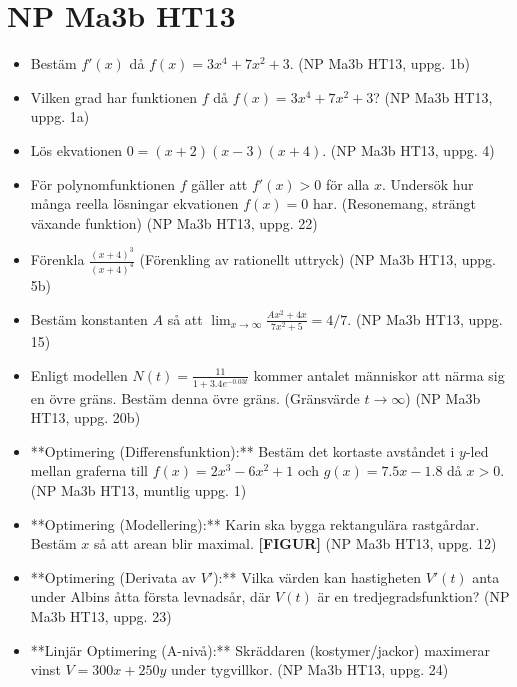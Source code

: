 \documentclass{article}
\begin{document}
\section*{NP Ma3b HT13}
\begin{itemize}
    \item Bestäm $f'(x)$ då $f(x) = 3x^4 + 7x^2 + 3$. (NP Ma3b HT13, uppg. 1b)
    \item Vilken grad har funktionen $f$ då $f(x) = 3x^4 + 7x^2 + 3$? (NP Ma3b HT13, uppg. 1a)
    \item Lös ekvationen $0 = (x+2)(x-3)(x+4)$. (NP Ma3b HT13, uppg. 4)
    \item För polynomfunktionen $f$ gäller att $f'(x) > 0$ för alla $x$. Undersök hur många reella lösningar ekvationen $f(x) = 0$ har. (Resonemang, strängt växande funktion) (NP Ma3b HT13, uppg. 22)
    \item Förenkla $\frac{(x+4)^3}{(x+4)^4}$ (Förenkling av rationellt uttryck) (NP Ma3b HT13, uppg. 5b)
    \item Bestäm konstanten $A$ så att $\lim_{x \to \infty} \frac{A x^2 + 4 x}{7 x^2 + 5} = 4/7$. (NP Ma3b HT13, uppg. 15)
    \item Enligt modellen $N(t) = \frac{11}{1+3.4e^{-0.03t}}$ kommer antalet människor att närma sig en övre gräns. Bestäm denna övre gräns. (Gränsvärde $t \to \infty$) (NP Ma3b HT13, uppg. 20b)
    \item **Optimering (Differensfunktion):** Bestäm det kortaste avståndet i $y$-led mellan graferna till $f(x) = 2x^3 - 6x^2 + 1$ och $g(x) = 7.5x - 1.8$ då $x>0$. (NP Ma3b HT13, muntlig uppg. 1)
    \item **Optimering (Modellering):** Karin ska bygga rektangulära rastgårdar. Bestäm $x$ så att arean blir maximal. \textbf{[FIGUR]} (NP Ma3b HT13, uppg. 12)
    \item **Optimering (Derivata av $V'$):** Vilka värden kan hastigheten $V'(t)$ anta under Albins åtta första levnadsår, där $V(t)$ är en tredjegradsfunktion? (NP Ma3b HT13, uppg. 23)
    \item **Linjär Optimering (A-nivå):** Skräddaren (kostymer/jackor) maximerar vinst $V=300x+250y$ under tygvillkor. (NP Ma3b HT13, uppg. 24)
\end{itemize}
\end{document}

